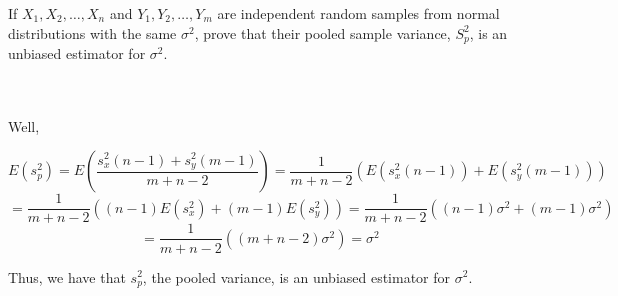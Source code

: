 If $X_1, X_2,\ldots, X_n$ and $Y_1, Y_2,\ldots,Y_m$ are independent random samples from normal
distributions with the same $\sigma^2$, prove that their pooled sample variance, $S_p^2$, is an
unbiased estimator for $\sigma^2$.\\\\

\begin{solution}\renewcommand{\qedsymbol}{}\ \\
    Well,
    
    $$E(s_p^2)=E(\frac{s_x^2(n-1)+s_y^2(m-1)}{m+n-2})=\frac{1}{m+n-2}(E(s_x^2(n-1))+E(s_y^2(m-1)))$$
    $$=\frac{1}{m+n-2}((n-1)E(s_x^2)+(m-1)E(s_y^2))=\frac{1}{m+n-2}((n-1)\sigma^2+(m-1)\sigma^2)$$
    $$=\frac{1}{m+n-2}((m+n-2)\sigma^2)=\sigma^2$$
    
    Thus, we have that $s_p^2$, the pooled variance, is an unbiased estimator for $\sigma^2$.

\end{solution}